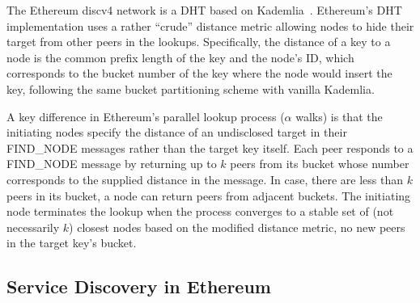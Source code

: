 The Ethereum discv4 network is a DHT based on Kademlia~\cite{maymounkov2002kademlia}. %
Ethereum's DHT implementation uses a rather ``crude'' distance metric allowing nodes to hide their target from other peers in the lookups. Specifically, the distance of a key to a node is the common prefix length of the key and the node's ID, which corresponds to the bucket number of the key where the node would insert the key, following the same bucket partitioning scheme with vanilla Kademlia.

A key difference in Ethereum's parallel lookup process (\ie $\alpha$ walks) is that the initiating nodes specify the distance of an undisclosed target in their FIND\_NODE messages rather than the target key itself. Each peer responds to a FIND\_NODE message by returning up to $k$ peers from its bucket whose number corresponds to the supplied distance in the message. In case, there are less than $k$ peers in its bucket, a node can return peers from adjacent buckets. The initiating node terminates the lookup when the process converges to a stable set of (not necessarily $k$) closest nodes based on the modified distance metric, \ie no new peers in the target key's bucket.



\subsection{Service Discovery in Ethereum}
\label{sec:discv4}

